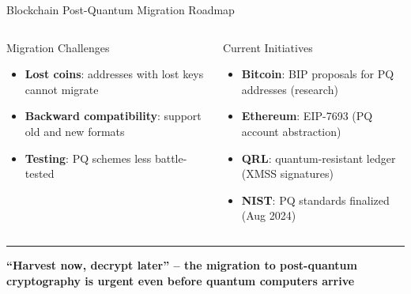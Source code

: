 \documentclass[8pt,aspectratio=169]{beamer}
\newcommand{\bottomnote}[1]{\vfill\vspace{-2mm}\textcolor{mllavender2}{\rule{\textwidth}{0.4pt}}\vspace{1mm}\footnotesize\textbf{#1}}
\begin{document}
\begin{frame}{Blockchain Post-Quantum Migration Roadmap}
\begin{columns}
\begin{block}{Migration Challenges}
\begin{itemize}
  \item \textbf{Lost coins}: addresses with lost keys cannot migrate
  \item \textbf{Backward compatibility}: support old and new formats
  \item \textbf{Testing}: PQ schemes less battle-tested
\end{itemize}
\end{block}
\begin{block}{Current Initiatives}
\begin{itemize}\small
  \item \textbf{Bitcoin}: BIP proposals for PQ addresses (research)
  \item \textbf{Ethereum}: EIP-7693 (PQ account abstraction)
  \item \textbf{QRL}: quantum-resistant ledger (XMSS signatures)
  \item \textbf{NIST}: PQ standards finalized (Aug 2024)
\end{itemize}
\end{block}
\end{columns}
\bottomnote{``Harvest now, decrypt later'' -- the migration to post-quantum cryptography is urgent even before quantum computers arrive}
\end{frame}
\end{document}
